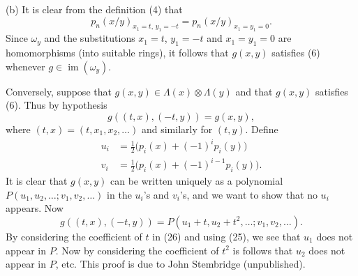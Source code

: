 (b) It is clear from the definition (4) that
\[
p_n(x/y)_{x_1=t,\,y_1=-t}=p_n(x/y)_{x_1=y_1=0}.
\]
Since $\omega_y$ and the substitutions $x_1=t$, $y_1=-t$ and $x_1=y_1=0$ are homomorphisms (into suitable rings), it follows that $g(x,y)$ satisfies (6) whenever $g\in\operatorname{im}(\omega_y)$.

Conversely, suppose that $g(x,y)\in\Lambda(x)\otimes\Lambda(y)$ and that $g(x,y)$ satisfies (6). Thus by hypothesis
\[
g((t,x),(-t,y))=g(x,y), \tag{25}
\]
where $(t,x)=(t,x_1,x_2,\ldots)$ and similarly for $(t,y)$. Define
\[
\begin{aligned}
u_i&=\frac{1}{2}\Big(p_i(x)+(-1)^i p_i(y)\Big)\\
v_i&=\frac{1}{2}\Big(p_i(x)+(-1)^{i-1}p_i(y)\Big).
\end{aligned}
\]
It is clear that $g(x,y)$ can be written uniquely as a polynomial $P(u_1,u_2,\ldots;v_1,v_2,\ldots)$ in the $u_i$'s and $v_i$'s, and we want to show that no $u_i$ appears. Now
\[
g((t,x),(-t,y))=P(u_1+t,u_2+t^2,\ldots;v_1,v_2,\ldots). \tag{26}
\]
By considering the coefficient of $t$ in (26) and using (25), we see that $u_1$ does not appear in $P$. Now by considering the coefficient of $t^2$ is follows that $u_2$ does not appear in $P$, etc. This proof is due to John Stembridge (unpublished).
